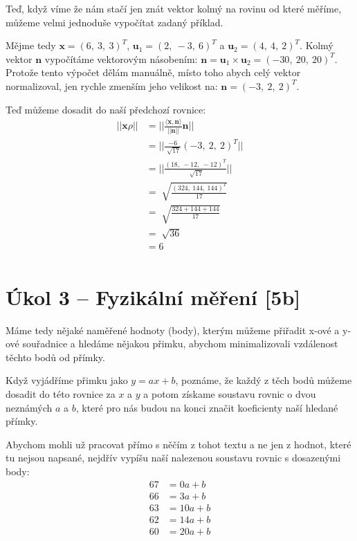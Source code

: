 \documentclass{../../../ksp}
\begin{document}
Teď, když víme že nám stačí jen znát vektor kolmý na rovinu od které měříme, můžeme velmi jednoduše vypočítat zadaný příklad.

Mějme tedy $\bm{x} = {(6,\ 3,\ 3)}^T$, $\bm{u}_1 = {(2,\ -3,\ 6)}^T$ a $\bm{u}_2 = {(4,\ 4,\ 2)}^T$.
Kolmý vektor $\bm{n}$ vypočítáme vektorovým násobením: $\bm{n} = \bm{u}_1 \times \bm{u}_2 = {(-30,\ 20,\ 20)}^T$.
Protože tento výpočet dělám manuálně, místo toho abych celý vektor normalizoval, jen rychle zmenším jeho velikost na:
$\bm{n} = {(-3,\ 2,\ 2)}^T$.

Teď můžeme dosadit do naší předchozí rovnice:
\begin{align*}
    ||\bm{x}\rho|| &= ||\frac{\langle \bm{x}, \bm{n} \rangle}{||\bm{n}||}\bm{n}||\\
    &= ||\frac{-6}{\sqrt[]{17}}{(-3,\ 2,\ 2)}^T||\\
    &= ||\frac{{(18,\ -12,\ -12)}^T}{\sqrt[]{17}}||\\
    &= \sqrt[]{\frac{{(324,\ 144,\ 144)}^T}{17}}\\
    &= \sqrt[]{\frac{324 + 144 + 144}{17}}\\
    &= \sqrt[]{36}\\
    &= 6\\
\end{align*}


\section*{Úkol 3 – Fyzikální měření [5b]}

Máme tedy nějaké naměřené hodnoty (body), kterým můžeme přiřadit x-ové a y-ové souřadnice
a hledáme nějakou přimku, abychom minimalizovali vzdálenost těchto bodů od přímky.

Když vyjádříme přimku jako $y = ax + b$, poznáme, že každý z těch bodů můžeme dosadit do této rovnice za $x$ a $y$
a potom získame soustavu rovnic o dvou neznámých $a$ a $b$, které pro nás budou na konci značit koeficienty naší hledané přímky.

Abychom mohli už pracovat přímo s něčím z tohot textu a ne jen z hodnot, které tu nejsou napsané, 
nejdřív vypíšu naší nalezenou soustavu rovnic s dosazenými body:
\begin{align*}
    67 &= 0a + b \\
    66 &= 3a + b\\
    63 &= 10a + b\\
    62 &= 14a + b\\
    60 &= 20a + b\\
\end{align*}
\end{document}
